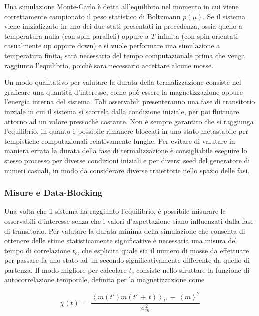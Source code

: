 Una simulazione Monte-Carlo è detta all'equilibrio nel momento in cui viene correttamente campionato il peso statistico di Boltzmann 
$p\left(\mu\right)$. Se il sistema viene inizializzato in uno dei due stati presentati in precedenza, ossia quello a temperatura 
nulla (con spin paralleli) oppure a $T$ infinita (con spin orientati casualmente up oppure down) e si vuole performare una simulazione a 
temperatura finita, sarà necessario del tempo computazionale prima che venga raggiunto l'equilibrio, poichè sara necessario accettare 
alcune mosse.

Un modo qualitativo per valutare la durata della termalizzazione consiste nel graficare una quantità d'interesse, 
come può essere la magnetizzazione oppure l'energia interna del sistema. Tali osservabili presenteranno una fase di transitorio 
iniziale in cui il sistema si scorrela dalla condizione iniziale, per poi fluttuare attorno ad un valore pressochè costante. Non è 
sempre garantito che si raggiunga l'equilibrio, in quanto è possibile rimanere bloccati in uno stato metastabile per tempistiche 
computazionali relativamente lunghe. Per evitare di valutare in maniera errata la durata della fase di termalizzazione è consigliabile 
eseguire lo stesso processo per diverse condizioni iniziali e per diversi seed del generatore di numeri casuali, in modo da considerare 
diverse traiettorie nello spazio delle fasi.  




\subsubsection{Misure e Data-Blocking}

Una volta che il sistema ha raggiunto l'equilibrio, è possibile misurare le osservabili d'interesse senza che i valori d'aspettazione 
siano influenzati dalla fase di transitorio. Per valutare la durata minima della simulazione che consenta di ottenere delle stime 
statisticamente significative è necessaria una misura del tempo di correlazione $t_c$, che esplicita quale sia il numero di mosse 
da effettuare per passare fa uno stato ad un secondo significativamente differente da quello di partenza. Il modo migliore per 
calcolare $t_c$ consiste nello sfruttare la funzione di autocorrelazione temporale, definita per la magnetizzazione come 

\begin{equation}
    \chi\left(t\right)\,=\,\frac{\left<m\left(t'\right)m\left(t'\,+\,t\right)\right>_{t'}\,-\,\left<m\right>^2}{\sigma^2_m}
    \label{eq: auto_corr_m}
\end{equation}
